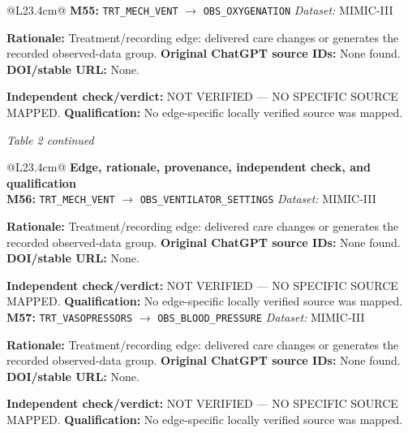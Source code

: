 \begin{tabular}{@{}L{23.4cm}@{}}
\addlinespace[2pt]
\midrule
\textbf{M55:} \nolinkurl{TRT_MECH_VENT} $\rightarrow$ \nolinkurl{OBS_OXYGENATION} \hfill \textit{Dataset:} MIMIC-III\par\textbf{Rationale:} Treatment/recording edge: delivered care changes or generates the recorded observed-data group. \textbf{Original ChatGPT source IDs:} None found. \textbf{DOI/stable URL:} None.\par\textbf{Independent check/verdict:} NOT VERIFIED --- NO SPECIFIC SOURCE MAPPED. \textbf{Qualification:} No edge-specific locally verified source was mapped. \\
\addlinespace[2pt]
\midrule
\bottomrule
\end{tabular}
\clearpage
\textit{Table 2 continued}\par
\begin{tabular}{@{}L{23.4cm}@{}}
\toprule
\textbf{Edge, rationale, provenance, independent check, and qualification}\\
\midrule
\textbf{M56:} \nolinkurl{TRT_MECH_VENT} $\rightarrow$ \nolinkurl{OBS_VENTILATOR_SETTINGS} \hfill \textit{Dataset:} MIMIC-III\par\textbf{Rationale:} Treatment/recording edge: delivered care changes or generates the recorded observed-data group. \textbf{Original ChatGPT source IDs:} None found. \textbf{DOI/stable URL:} None.\par\textbf{Independent check/verdict:} NOT VERIFIED --- NO SPECIFIC SOURCE MAPPED. \textbf{Qualification:} No edge-specific locally verified source was mapped. \\
\addlinespace[2pt]
\midrule
\textbf{M57:} \nolinkurl{TRT_VASOPRESSORS} $\rightarrow$ \nolinkurl{OBS_BLOOD_PRESSURE} \hfill \textit{Dataset:} MIMIC-III\par\textbf{Rationale:} Treatment/recording edge: delivered care changes or generates the recorded observed-data group. \textbf{Original ChatGPT source IDs:} None found. \textbf{DOI/stable URL:} None.\par\textbf{Independent check/verdict:} NOT VERIFIED --- NO SPECIFIC SOURCE MAPPED. \textbf{Qualification:} No edge-specific locally verified source was mapped. \\
\addlinespace[2pt]
\midrule
\bottomrule
\end{tabular}
